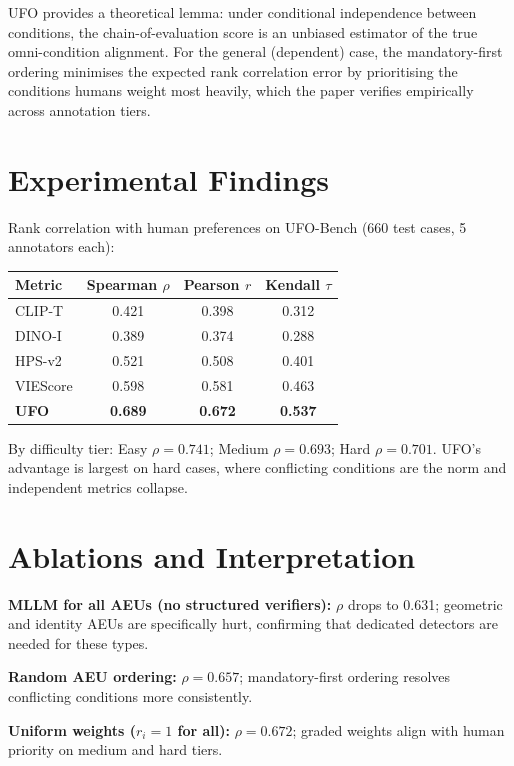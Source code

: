 \documentclass[10pt,twocolumn]{article}
\begin{document}
UFO provides a theoretical lemma: under conditional independence between
conditions, the chain-of-evaluation score is an unbiased estimator of
the true omni-condition alignment. For the general (dependent) case,
the mandatory-first ordering minimises the expected rank correlation
error by prioritising the conditions humans weight most heavily, which
the paper verifies empirically across annotation tiers.

\section{Experimental Findings}

Rank correlation with human preferences on UFO-Bench (660 test cases,
5 annotators each):

\begin{center}
\small
\begin{tabular}{lccc}
\toprule
Metric & Spearman $\rho$ & Pearson $r$ & Kendall $\tau$ \\
\midrule
CLIP-T & 0.421 & 0.398 & 0.312 \\
DINO-I & 0.389 & 0.374 & 0.288 \\
HPS-v2 & 0.521 & 0.508 & 0.401 \\
VIEScore & 0.598 & 0.581 & 0.463 \\
\textbf{UFO} & \textbf{0.689} & \textbf{0.672} & \textbf{0.537} \\
\bottomrule
\end{tabular}
\end{center}

By difficulty tier: Easy $\rho=0.741$; Medium $\rho=0.693$;
Hard $\rho=0.701$. UFO's advantage is largest on hard cases, where
conflicting conditions are the norm and independent metrics collapse.

\section{Ablations and Interpretation}

\textbf{MLLM for all AEUs (no structured verifiers):} $\rho$ drops to
0.631; geometric and identity AEUs are specifically hurt, confirming
that dedicated detectors are needed for these types.

\textbf{Random AEU ordering:} $\rho=0.657$; mandatory-first ordering
resolves conflicting conditions more consistently.

\textbf{Uniform weights ($r_i{=}1$ for all):} $\rho=0.672$; graded
weights align with human priority on medium and hard tiers.
\end{document}
